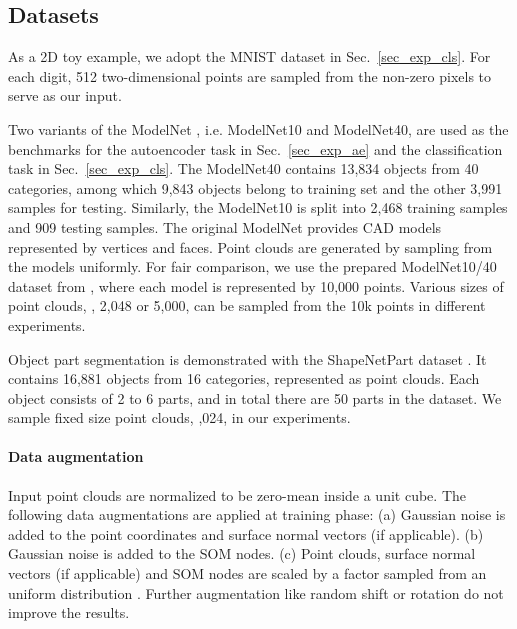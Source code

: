 \documentclass[10pt,twocolumn,letterpaper]{article}
\begin{document}
\subsection{Datasets}
As a 2D toy example, we adopt the MNIST dataset \cite{lecun1998gradient} in Sec.~\ref{sec_exp_cls}. For each digit, 512 two-dimensional points are sampled from the non-zero pixels to serve as our input.

Two variants of the ModelNet \cite{wu20153d}, i.e. ModelNet10 and ModelNet40, are used as the benchmarks for the autoencoder task in Sec.~\ref{sec_exp_ae} and the classification task in Sec.~\ref{sec_exp_cls}. The ModelNet40 contains 13,834 objects from 40 categories, among which 9,843 objects belong to training set and the other 3,991 samples for testing. Similarly, the ModelNet10 is split into 2,468 training samples and 909 testing samples. The original ModelNet provides CAD models represented by vertices and faces. Point clouds are generated by sampling from the models uniformly. For fair comparison, we use the prepared ModelNet10/40 dataset from \cite{qi2017pointnet++}, where each model is represented by 10,000 points. Various sizes of point clouds, \eg, 2,048 or 5,000, can be sampled from the 10k points in different experiments.

Object part segmentation is demonstrated with the ShapeNetPart dataset \cite{yi2016scalable}. It contains 16,881 objects from 16 categories, represented as point clouds. Each object consists of 2 to 6 parts, and in total there are 50 parts in the dataset. We sample fixed size point clouds, ,024, in our experiments.

\paragraph{Data augmentation}
Input point clouds are normalized to be zero-mean inside a unit cube. The following data augmentations are applied at training phase: (a) Gaussian noise  is added to the point coordinates and surface normal vectors (if applicable). (b) Gaussian noise  is added to the SOM nodes. (c) Point clouds, surface normal vectors (if applicable) and SOM nodes are scaled by a factor sampled from an uniform distribution . Further augmentation like random shift or rotation do not improve the results.
\end{document}
